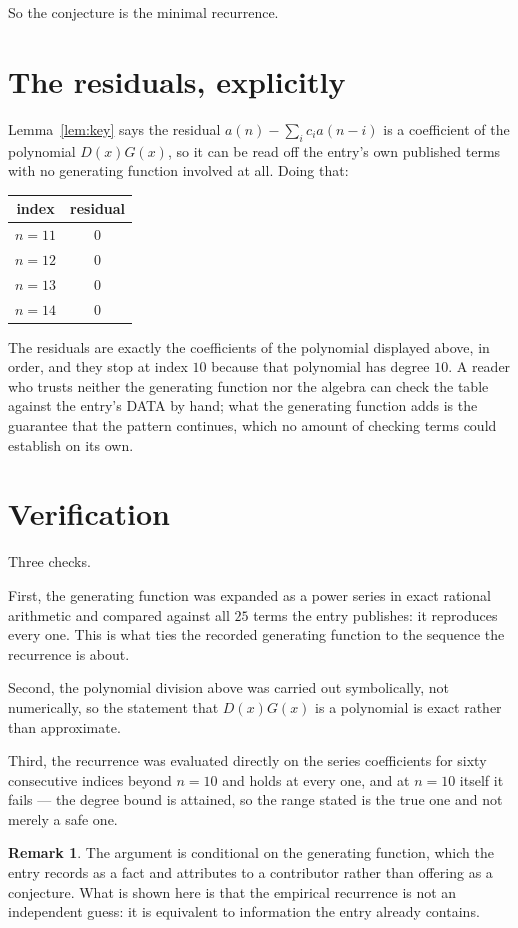 \documentclass[11pt,a4paper]{article}
\theoremstyle{plain}
\theoremstyle{definition}
\newtheorem{remark}[theorem]{Remark}
\begin{document}
So the conjecture is the minimal recurrence.

\section{The residuals, explicitly}

Lemma~\ref{lem:key} says the residual $a(n)-\sum_ic_ia(n-i)$ is a coefficient of the
polynomial $D(x)G(x)$, so it can be read off the entry's own published terms with no
generating function involved at all. Doing that:
\begin{center}
\begin{tabular}{cc}
index & residual \\ \hline
$n=11$ & $0$ \\
$n=12$ & $0$ \\
$n=13$ & $0$ \\
$n=14$ & $0$
\end{tabular}
\end{center}
The residuals are exactly the coefficients of the polynomial displayed above, in order, and
they stop at index $10$ because that polynomial has degree $10$. A reader who trusts
neither the generating function nor the algebra can check the table against the entry's DATA
by hand; what the generating function adds is the guarantee that the pattern continues, which
no amount of checking terms could establish on its own.

\section{Verification}

Three checks.

First, the generating function was expanded as a power series in exact rational arithmetic and
compared against all $25$ terms the entry publishes: it reproduces every one. This is
what ties the recorded generating function to the sequence the recurrence is about.

Second, the polynomial division above was carried out symbolically, not numerically, so the
statement that $D(x)G(x)$ is a polynomial is exact rather than approximate.

Third, the recurrence was evaluated directly on the series coefficients for sixty consecutive
indices beyond $n=10$ and holds at every one, and at $n=10$ itself it fails --- the
degree bound is attained, so the range stated is the true one and not merely a safe one.

\begin{remark}
The argument is conditional on the generating function, which the entry records as a fact and
attributes to a contributor rather than offering as a conjecture. What is shown here is that
the empirical recurrence is not an independent guess: it is equivalent to information the
entry already contains.
\end{remark}
\end{document}
